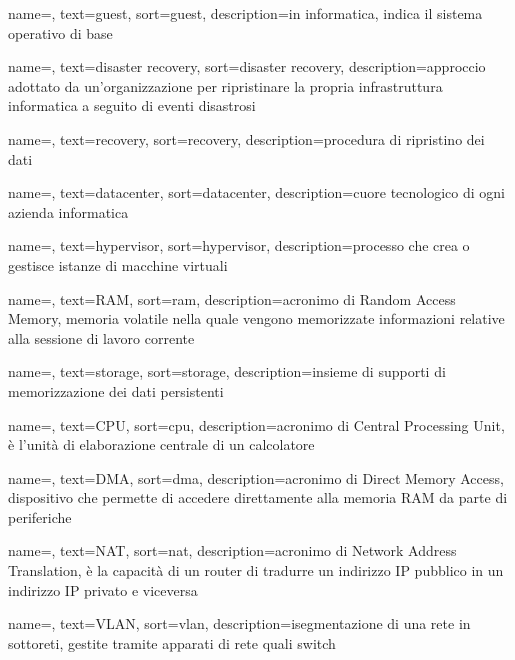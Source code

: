 {
    name=,
    text=guest,
    sort=guest, 
    description={in informatica, indica il sistema operativo di base}
}

{
    name=,
    text=disaster recovery,
    sort=disaster recovery, 
    description={approccio adottato da un'organizzazione per ripristinare la propria infrastruttura informatica a seguito di eventi disastrosi}
}

{
    name=,
    text=recovery,
    sort=recovery, 
    description={procedura di ripristino dei dati}
}

{
    name=,
    text=datacenter,
    sort=datacenter, 
    description={cuore tecnologico di ogni azienda informatica}
}

{
    name=,
    text=hypervisor,
    sort=hypervisor, 
    description={processo che crea o gestisce istanze di macchine virtuali}
}

{
    name=,
    text=RAM,
    sort=ram, 
    description={acronimo di Random Access Memory, memoria volatile nella quale vengono memorizzate informazioni relative alla sessione di lavoro corrente}
}

{
    name=,
    text=storage,
    sort=storage, 
    description={insieme di supporti di memorizzazione dei dati persistenti}
}

{
    name=,
    text=CPU,
    sort=cpu, 
    description={acronimo di Central Processing Unit, è l'unità di elaborazione centrale di un calcolatore}
}

{
    name=,
    text=DMA,
    sort=dma, 
    description={acronimo di Direct Memory Access, dispositivo che permette di accedere direttamente alla memoria RAM da parte di periferiche}
}

{
    name=,
    text=NAT,
    sort=nat, 
    description={acronimo di Network Address Translation, è la capacità di un router di tradurre un indirizzo IP pubblico in un indirizzo IP privato e viceversa}
}

{
    name=,
    text=VLAN,
    sort=vlan, 
    description={isegmentazione di una rete in sottoreti, gestite tramite apparati di rete quali switch}
}


